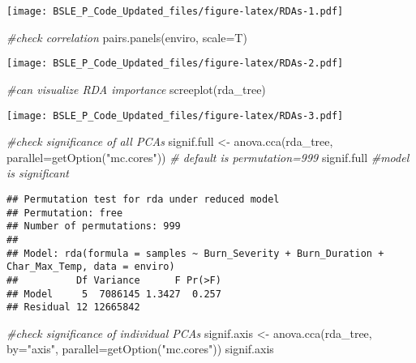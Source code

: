 \documentclass[
]{article}
\newenvironment{Shaded}{\begin{snugshade}}{\end{snugshade}}
\newcommand{\AttributeTok}[1]{\textcolor[rgb]{0.77,0.63,0.00}{#1}}
\newcommand{\CommentTok}[1]{\textcolor[rgb]{0.56,0.35,0.01}{\textit{#1}}}
\newcommand{\FunctionTok}[1]{\textcolor[rgb]{0.00,0.00,0.00}{#1}}
\newcommand{\NormalTok}[1]{#1}
\newcommand{\OtherTok}[1]{\textcolor[rgb]{0.56,0.35,0.01}{#1}}
\newcommand{\StringTok}[1]{\textcolor[rgb]{0.31,0.60,0.02}{#1}}
\begin{document}
\texttt{[image: BSLE\_P\_Code\_Updated\_files/figure-latex/RDAs-1.pdf]}

\begin{Shaded}
\begin{Highlighting}[]
\CommentTok{\#check correlation}
\FunctionTok{pairs.panels}\NormalTok{(enviro, }\AttributeTok{scale=}\NormalTok{T)}
\end{Highlighting}
\end{Shaded}

\texttt{[image: BSLE\_P\_Code\_Updated\_files/figure-latex/RDAs-2.pdf]}

\begin{Shaded}
\begin{Highlighting}[]
\CommentTok{\#can visualize RDA importance}
\FunctionTok{screeplot}\NormalTok{(rda\_tree)}
\end{Highlighting}
\end{Shaded}

\texttt{[image: BSLE\_P\_Code\_Updated\_files/figure-latex/RDAs-3.pdf]}

\begin{Shaded}
\begin{Highlighting}[]
\CommentTok{\#check significance of all PCAs}
\NormalTok{signif.full }\OtherTok{\textless{}{-}} \FunctionTok{anova.cca}\NormalTok{(rda\_tree, }\AttributeTok{parallel=}\FunctionTok{getOption}\NormalTok{(}\StringTok{"mc.cores"}\NormalTok{)) }\CommentTok{\# default is permutation=999}
\NormalTok{signif.full }\CommentTok{\#model is significant}
\end{Highlighting}
\end{Shaded}

\begin{verbatim}
## Permutation test for rda under reduced model
## Permutation: free
## Number of permutations: 999
## 
## Model: rda(formula = samples ~ Burn_Severity + Burn_Duration + Char_Max_Temp, data = enviro)
##          Df Variance      F Pr(>F)
## Model     5  7086145 1.3427  0.257
## Residual 12 12665842
\end{verbatim}

\begin{Shaded}
\begin{Highlighting}[]
\CommentTok{\#check significance of individual PCAs}
\NormalTok{signif.axis }\OtherTok{\textless{}{-}} \FunctionTok{anova.cca}\NormalTok{(rda\_tree, }\AttributeTok{by=}\StringTok{"axis"}\NormalTok{, }\AttributeTok{parallel=}\FunctionTok{getOption}\NormalTok{(}\StringTok{"mc.cores"}\NormalTok{))}
\NormalTok{signif.axis }
\end{Highlighting}
\end{Shaded}
\end{document}
